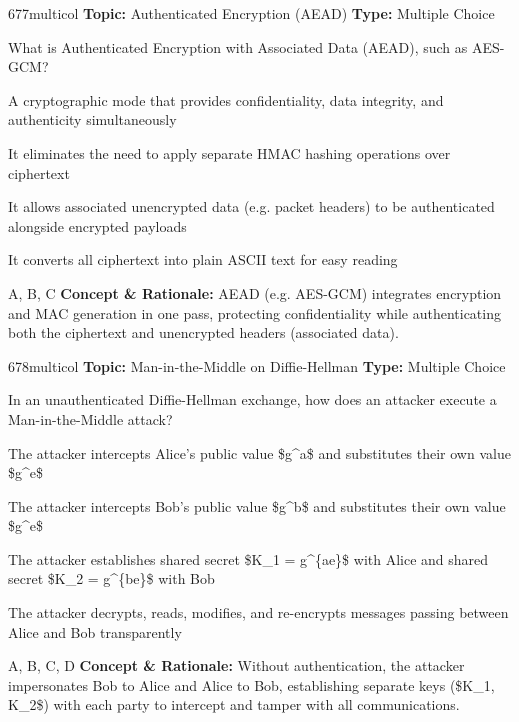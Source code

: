 \begin{qcard}{677}{multicol}
\textcolor{darkslate!75}{\small\textbf{Topic:} Authenticated Encryption (AEAD) \hfill \textbf{Type:} Multiple Choice}\vspace{0.4em}\par
What is Authenticated Encryption with Associated Data (AEAD), such as AES-GCM?
\begin{qoptions}
\item A cryptographic mode that provides confidentiality, data integrity, and authenticity simultaneously
\item It eliminates the need to apply separate HMAC hashing operations over ciphertext
\item It allows associated unencrypted data (e.g. packet headers) to be authenticated alongside encrypted payloads
\item It converts all ciphertext into plain ASCII text for easy reading
\end{qoptions}
\end{qcard}
\nopagebreak
\begin{explainbox}{A, B, C}
\textbf{Concept \& Rationale:} AEAD (e.g. AES-GCM) integrates encryption and MAC generation in one pass, protecting confidentiality while authenticating both the ciphertext and unencrypted headers (associated data).
\end{explainbox}

\begin{qcard}{678}{multicol}
\textcolor{darkslate!75}{\small\textbf{Topic:} Man-in-the-Middle on Diffie-Hellman \hfill \textbf{Type:} Multiple Choice}\vspace{0.4em}\par
In an unauthenticated Diffie-Hellman exchange, how does an attacker execute a Man-in-the-Middle attack?
\begin{qoptions}
\item The attacker intercepts Alice's public value \$g\textasciicircum{}a\$ and substitutes their own value \$g\textasciicircum{}e\$
\item The attacker intercepts Bob's public value \$g\textasciicircum{}b\$ and substitutes their own value \$g\textasciicircum{}e\$
\item The attacker establishes shared secret \$K\_1 = g\textasciicircum{}\{ae\}\$ with Alice and shared secret \$K\_2 = g\textasciicircum{}\{be\}\$ with Bob
\item The attacker decrypts, reads, modifies, and re-encrypts messages passing between Alice and Bob transparently
\end{qoptions}
\end{qcard}
\nopagebreak
\begin{explainbox}{A, B, C, D}
\textbf{Concept \& Rationale:} Without authentication, the attacker impersonates Bob to Alice and Alice to Bob, establishing separate keys (\$K\_1, K\_2\$) with each party to intercept and tamper with all communications.
\end{explainbox}


